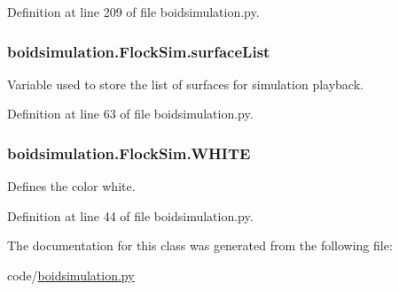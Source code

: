 Definition at line 209 of file boidsimulation.\-py.

\hypertarget{classboidsimulation_1_1FlockSim_a60f47dc6f8186030cd22f3ca3b37c4e6}{
\subsubsection[{surface\-List}]{\setlength{\rightskip}{0pt plus 5cm}boidsimulation.\-Flock\-Sim.\-surface\-List}}\label{classboidsimulation_1_1FlockSim_a60f47dc6f8186030cd22f3ca3b37c4e6}


Variable used to store the list of surfaces for simulation playback. 



Definition at line 63 of file boidsimulation.\-py.

\hypertarget{classboidsimulation_1_1FlockSim_afe8d83a914aeae9d188cdf61053de56c}{
\subsubsection[{W\-H\-I\-T\-E}]{\setlength{\rightskip}{0pt plus 5cm}boidsimulation.\-Flock\-Sim.\-W\-H\-I\-T\-E}}\label{classboidsimulation_1_1FlockSim_afe8d83a914aeae9d188cdf61053de56c}


Defines the color white. 



Definition at line 44 of file boidsimulation.\-py.



The documentation for this class was generated from the following file\-:\begin{DoxyCompactItemize}
\item 
code/\hyperlink{boidsimulation_8py}{boidsimulation.\-py}\end{DoxyCompactItemize}
